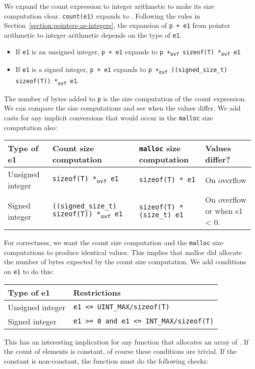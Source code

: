 We expand the count expression to integer arithmetic to make its size
computation clear. \texttt{count(e1)} expands to . 
Following the rules in Section~\ref{section:pointers-as-integers},
the expansion of \texttt{p +
e1} from pointer arithmetic to integer arithmetic depends on the type of
\texttt{e1}.

\begin{itemize}
\item
  If \texttt{e1} is an unsigned integer, \texttt{p + e1} expands to
  \texttt{p +\textsubscript{ovf} sizeof(T) *\textsubscript{ovf} e1}
\item
  If \texttt{e1} is a signed integer, \texttt{p + e1} expands to
  \texttt{p +\textsubscript{ovf} ((signed\_size\_t) sizeof(T))
  *\textsubscript{ovf} e1}.
\end{itemize}

The number of bytes added to \texttt{p} is the size computation of the
count expression. We can compare the size computations and see when the
values differ. We add casts for any implicit conversions that would
occur in the \texttt{malloc} size computation also:

\begin{longtable}[c]{lp{1.75in}p{1.75in}p{1in}}
\toprule
Type of e1 & Count size computation & \texttt{malloc} size computation &
Values differ?\tabularnewline
\midrule
\endhead
Unsigned integer & \texttt{sizeof(T) *\textsubscript{ovf} e1} &
\texttt{sizeof(T) * e1} & On overflow\tabularnewline
Signed integer & \texttt{((signed\_size\_t) sizeof(T))
*\textsubscript{ovf} e1} & \texttt{sizeof(T) * (size\_t) e1} & On
overflow or when e1 \textless{} 0.\tabularnewline
\bottomrule
\end{longtable}

For correctness, we want the count size computation and the
\texttt{malloc} size computations to produce identical values. This
implies that malloc did allocate the number of bytes expected by the
count size computation. We add conditions on \texttt{e1} to do this:

\begin{longtable}[c]{ll}
\toprule
Type of e1 & Restrictions\tabularnewline
\midrule
\endhead
Unsigned integer & \texttt{e1 <= UINT\_MAX/sizeof(T)}\tabularnewline
Signed integer & \texttt{e1 >= 0 and e1 <= INT\_MAX/sizeof(T)}\tabularnewline
\bottomrule
\end{longtable}

This has an interesting implication for any function that allocates an
array of . If the count of elements is constant, of course these
conditions are trivial. If the constant is non-constant, the function
must do the following checks:

